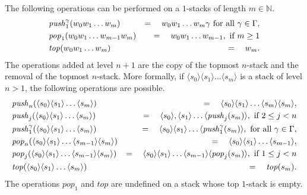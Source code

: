 \documentclass[a4paper,UKenglish,cleveref, autoref, thm-restate]{lipics-v2021}
\newcommand{\N}{\mathbb{N}}
\begin{document}
The following operations can be performed on a $1$-stacks of length $m \in \N$.
\begin{eqnarray*}
&\text{\textit{push}}_1^\gamma( w_0 w_1 \ldots w_m) &=\quad w_0 w_1 \ldots w_m \gamma   \text{ for all } \gamma \in  \Gamma, \\
&\text{\textit{pop}}_1(w_0 w_1 \ldots w_{m-1} w_m ) &=\quad w_0 w_1 \ldots w_{m-1}, \text{ if } m \geq 1\\
&\text{\textit{top}}( w_0 w_1 \ldots w_m ) &=\quad w_m.
\end{eqnarray*}
The operations added at level $n+1$ are the copy of the topmost $n$-stack
and the removal of the topmost $n$-stack.
More formally, if $ \langle s_0 \rangle \langle s_1 \rangle \ldots \langle s_m \rangle$ is a stack of 
level $n > 1$, 
the following operations are possible.
%
\begin{eqnarray*}
&\text{\textit{push}}_n( \langle s_0 \rangle \langle s_1 \rangle \ldots \langle s_m \rangle) &=\quad  \langle s_0 \rangle \langle s_1 \rangle \ldots \langle s_m \rangle \langle s_m \rangle , \\
&\text{\textit{push}}_j( \langle s_0 \rangle \langle s_1 \rangle \ldots \langle s_m \rangle) &=\quad \langle s_0 \rangle, \langle s_1 \rangle \ldots 
\langle \text{\textit{push}}_j(s_m) \rangle,
\text{ if } 2 \leq j < n\\
&\text{\textit{push}}_1^\gamma( \langle s_0 \rangle \langle s_1 \rangle \ldots \langle s_m \rangle) &= \quad
\langle s_0 \rangle \langle s_1 \rangle \ldots 
\langle \text{\textit{push}}_1^\gamma(s_m) \rangle,
\text{ for all } \gamma \in \Gamma,\\
&\text{\textit{pop}}_n( \langle s_0 \rangle \langle s_1 \rangle \ldots \langle s_{m-1} \rangle \langle s_m \rangle) &= \quad
\langle s_0 \rangle \langle s_1 \rangle \ldots \langle s_{m-1} \rangle
,\\
&\text{\textit{pop}}_j( \langle s_0 \rangle \langle s_1 \rangle \ldots \langle s_{m-1} \rangle \langle s_m \rangle) &= \quad
\langle s_0 \rangle \langle s_1 \rangle \ldots \langle s_{m-1} \rangle
\langle \text{\textit{pop}}_j(s_m) \rangle,
\text{ if } 1 \leq j < n\\
&\text{\textit{top}}( \langle s_0 \rangle \langle s_1 \rangle \ldots \langle s_m \rangle) &=\quad
\text{\textit{top}}(s_m).
\end{eqnarray*}
The operations $pop_1$ and $top$ are undefined on a stack whose top $1$-stack is empty.  \\
\end{document}
